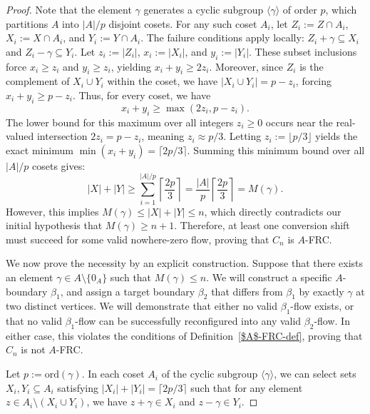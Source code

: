 \documentclass[a4paper,12pt]{article}
\theoremstyle{plain}
\theoremstyle{definition}
\renewcommand\le\leqslant
\renewcommand\ge\geqslant
\newcommand\ord{\textrm{ord}}
\begin{document}
\begin{proof}
Note that the element $\gamma$ generates a cyclic subgroup $\langle \gamma \rangle$ of order $p$,
which partitions $A$ into $|A|/p$ disjoint cosets. For any such coset $A_i$, let $Z_i:= Z \cap A_i$, $X_i:= X \cap A_i$, and $Y_i:= Y \cap A_i$. The failure conditions apply locally: $Z_i + \gamma \subseteq X_i$ and $Z_i - \gamma \subseteq Y_i$. Let $z_i:= |Z_i|$, $x_i:= |X_i|$, and $y_i:= |Y_i|$. These subset inclusions force $x_i \ge z_i$ and $y_i \ge z_i$, yielding $x_i + y_i \ge 2z_i$. Moreover, since $Z_i$ is the complement of $X_i \cup Y_i$ within the coset, we have $|X_i \cup Y_i| = p - z_i$, forcing $x_i + y_i \ge p - z_i$. Thus, for every coset, we have 
\[ x_i + y_i \ge \max(2z_i, p - z_i). \]
The lower bound for this maximum over all integers $z_i \ge 0$ occurs near the real-valued intersection $2z_i = p - z_i$, meaning $z_i \approx p/3$. Letting $z_i:= \lfloor p/3 \rfloor$ yields the exact minimum $\min(x_i + y_i) = \lceil 2p/3 \rceil$. Summing this minimum bound over all $|A|/p$ cosets gives:
\[ |X| + |Y| \ge \sum_{i=1}^{|A|/p} \left\lceil \frac{2p}{3} \right\rceil = \frac{|A|}{p} \left\lceil \frac{2p}{3} \right\rceil = M(\gamma). \]
However, this implies $M(\gamma) \le |X| + |Y| \le n$, which directly contradicts our initial hypothesis that $M(\gamma) \ge n+1$. Therefore, at least one conversion shift must succeed for some valid nowhere-zero flow, proving that $C_n$ is $A$-FRC.
\medskip

We now prove the necessity by an explicit construction. Suppose that there exists an element $\gamma \in A \setminus \{0_A\}$ such that $M(\gamma) \le n$. We will construct a specific $A$-boundary $\beta_1$, and assign a target boundary $\beta_2$ that differs from $\beta_1$ by exactly $\gamma$ at two distinct vertices. We will demonstrate that either no valid $\beta_1$-flow exists, or that no valid $\beta_1$-flow can be successfully reconfigured into any valid $\beta_2$-flow. In either case, this violates the conditions of Definition~\ref{$A$-FRC-def}, proving that $C_n$ is not $A$-FRC. 

Let $p := \ord(\gamma)$. In each coset $A_i$ of the cyclic subgroup $\langle \gamma \rangle$, we can select sets $X_i, Y_i \subseteq A_i$ satisfying $|X_i| + |Y_i| = \lceil 2p/3 \rceil$ such that for any element $z \in A_i \setminus (X_i \cup Y_i)$, we have $z + \gamma \in X_i$ and $z - \gamma \in Y_i$. 


\end{proof}
\end{document}
